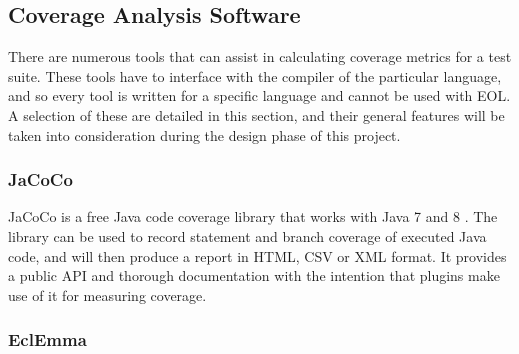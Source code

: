 %
%



\subsection{Coverage Analysis Software}

There are numerous tools that can assist in calculating coverage metrics for a test suite. These tools have to interface with the compiler of the particular language, and so every tool is written for a specific language and cannot be used with EOL. A selection of these are detailed in this section, and their general features will be taken into consideration during the design phase of this project.

\subsubsection{JaCoCo}

JaCoCo is a free Java code coverage library that works with Java 7 and 8 \cite{JaCoCo}. The library can be used to record statement and branch coverage of executed Java code, and will then produce a report in HTML, CSV or XML format. It provides a public API and thorough documentation with the intention that plugins make use of it for measuring coverage.

\subsubsection{EclEmma}

